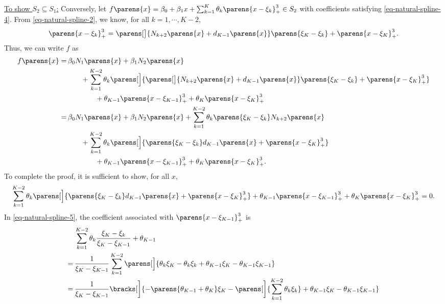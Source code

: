 \documentclass[12pt]{article}
\begin{document}
\begin{enumerate}[label=\textbf{\arabic*.}]
\begin{enumerate}
		\underline{To show $S_2 \subseteq S_1$:} Conversely, let $f \parens{x} = \beta_0 + \beta_1 x + \sum_{k=1}^K \theta_k \parens{x - \xi_k}_+^3 \in S_2$ with coefficients satisfying \eqref{eq-natural-spline-4}. From \eqref{eq-natural-spline-2}, we know, for all $k = 1, \cdots, K-2$, 
		\begin{align*}
			\parens{x - \xi_k}_+^3 = \parens[\big]{N_{k+2} \parens{x} + d_{K-1} \parens{x} } \parens{\xi_K - \xi_k} + \parens{x - \xi_K}_+^3. 
		\end{align*}
		Thus, we can write $f$ as 
		\begin{align*}
			f \parens{x} = & \, \beta_0 N_1 \parens{x} + \beta_1 N_2 \parens{x} \\ 
			& \qquad + \sum_{k=1}^{K-2} \theta_k \parens[\Big]{\parens[\big]{N_{k+2} \parens{x} + d_{K-1} \parens{x} } \parens{\xi_K - \xi_k} + \parens{x - \xi_K}_+^3} \\ 
			& \qquad \qquad + \theta_{K-1} \parens{x - \xi_{K-1}}_+^3 + \theta_{K} \parens{x - \xi_{K}}_+^3 \\ 
			= & \, \beta_0 N_1 \parens{x} + \beta_1 N_2 \parens{x} + \sum_{k=1}^{K-2} \theta_k \parens{\xi_K - \xi_k} N_{k+2} \parens{x} \\ 
			& \qquad  + \sum_{k=1}^{K-2} \theta_k \parens[\Big]{ \parens{\xi_K - \xi_k} d_{K-1} \parens{x} + \parens{x - \xi_K}_+^3} \\ 
			& \qquad \qquad + \theta_{K-1} \parens{x - \xi_{K-1}}_+^3 + \theta_{K} \parens{x - \xi_{K}}_+^3. 
		\end{align*}
		To complete the proof, it is sufficient to show, for all $x$, 
		\begin{align}\label{eq-natural-spline-5}
			\sum_{k=1}^{K-2} \theta_k \parens[\Big]{ \parens{\xi_K - \xi_k} d_{K-1} \parens{x} + \parens{x - \xi_K}_+^3} + \theta_{K-1} \parens{x - \xi_{K-1}}_+^3 + \theta_{K} \parens{x - \xi_{K}}_+^3 = 0. 
		\end{align}
		In \eqref{eq-natural-spline-5}, the coefficient associated with $\parens{x-\xi_{K-1}}_+^3$ is 
		\begin{align*}
			& \, \sum_{k=1}^{K-2} \theta_k \frac{\xi_K - \xi_k}{\xi_K - \xi_{K-1}} + \theta_{K-1} \\ 
			= & \, \frac{1}{\xi_K - \xi_{K-1}} \sum_{k=1}^{K-2} \parens[\Big]{ \theta_k \xi_K - \theta_k \xi_k + \theta_{K-1} \xi_K - \theta_{K-1} \xi_{K-1}} \\ 
			= & \, \frac{1}{\xi_K - \xi_{K-1}} \bracks[\bigg]{ - \parens{\theta_{K-1} + \theta_K} \xi_K - \parens[\bigg]{ \sum_{k=1}^{K-2} \theta_k \xi_k } + \theta_{K-1} \xi_K - \theta_{K-1} \xi_{K-1}}  \\ 

\end{align*}
\end{enumerate}
\end{enumerate}
\end{document}
